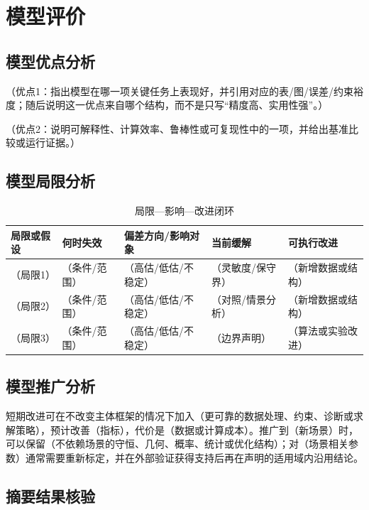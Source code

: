 \documentclass[UTF8,zihao=-4]{ctexart}
\newcommand{\fillin}[1]{（#1）}
\begin{document}
\section{模型评价}

\subsection{模型优点分析}

\fillin{优点1：指出模型在哪一项关键任务上表现好，并引用对应的表/图/误差/约束裕度；随后说明这一优点来自哪个结构，而不是只写“精度高、实用性强”。}

\fillin{优点2：说明可解释性、计算效率、鲁棒性或可复现性中的一项，并给出基准比较或运行证据。}

\subsection{模型局限分析}

\begin{table}[htbp]
  \centering
  \caption{局限—影响—改进闭环}
  \small
  \begin{tabularx}{0.94\textwidth}{YLLLL}
    \toprule
    局限或假设 & 何时失效 & 偏差方向/影响对象 & 当前缓解 & 可执行改进 \\
    \midrule
    \fillin{局限1} & \fillin{条件/范围} & \fillin{高估/低估/不稳定} & \fillin{灵敏度/保守界} & \fillin{新增数据或结构} \\
    \fillin{局限2} & \fillin{条件/范围} & \fillin{高估/低估/不稳定} & \fillin{对照/情景分析} & \fillin{新增数据或结构} \\
    \fillin{局限3} & \fillin{条件/范围} & \fillin{高估/低估/不稳定} & \fillin{边界声明} & \fillin{算法或实验改进} \\
    \bottomrule
  \end{tabularx}
\end{table}

\subsection{模型推广分析}

短期改进可在不改变主体框架的情况下加入\fillin{更可靠的数据处理、约束、诊断或求解策略}，预计改善\fillin{指标}，代价是\fillin{数据或计算成本}。推广到\fillin{新场景}时，可以保留\fillin{不依赖场景的守恒、几何、概率、统计或优化结构}；对\fillin{场景相关参数}通常需要重新标定，并在外部验证获得支持后再在声明的适用域内沿用结论。

\subsection{摘要结果核验}
\end{document}

